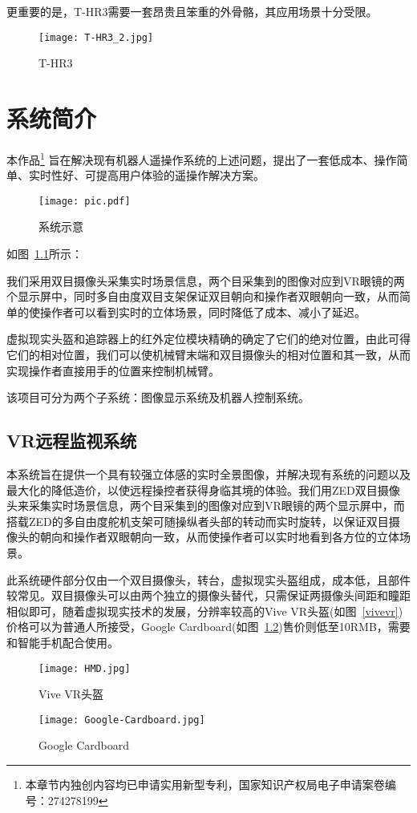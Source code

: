 更重要的是，T-HR3需要一套昂贵且笨重的外骨骼，其应用场景十分受限。

\begin{figure}[htbp]
\small
\centering
\texttt{[image: T-HR3\_2.jpg]}
\caption{T-HR3} 
\label{thr}
\end{figure}




\chapter{系统简介}
本作品\footnote{本章节内独创内容均已申请实用新型专利，国家知识产权局电子申请案卷编号：274278199}
旨在解决现有机器人遥操作系统的上述问题，提出了一套低成本、操作简单、实时性好、可提高用户体验的遥操作解决方案。


\begin{figure}[htbp]
\small
\centering
\texttt{[image: pic.pdf]}
\caption{系统示意} 
\label{pic}
\end{figure}


如图~\ref{pic}所示：

我们采用双目摄像头采集实时场景信息，两个目采集到的图像对应到VR眼镜的两个显示屏中，同时多自由度双目支架保证双目朝向和操作者双眼朝向一致，从而简单的使操作者可以看到实时的立体场景，同时降低了成本、减小了延迟。

虚拟现实头盔和追踪器上的红外定位模块精确的确定了它们的绝对位置，由此可得它们的相对位置，我们可以使机械臂末端和双目摄像头的相对位置和其一致，从而实现操作者直接用手的位置来控制机械臂。


该项目可分为两个子系统：图像显示系统及机器人控制系统。
	
	\section{VR远程监视系统}
本系统旨在提供一个具有较强立体感的实时全景图像，并解决现有系统的问题以及最大化的降低造价，以使远程操控者获得身临其境的体验。我们用ZED双目摄像头来采集实时场景信息，两个目采集到的图像对应到VR眼镜的两个显示屏中，而搭载ZED的多自由度舵机支架可随操纵者头部的转动而实时旋转，以保证双目摄像头的朝向和操作者双眼朝向一致，从而使操作者可以实时地看到各方位的立体场景。
	
此系统硬件部分仅由一个双目摄像头，转台，虚拟现实头盔组成，成本低，且部件较常见。双目摄像头可以由两个独立的摄像头替代，只需保证两摄像头间距和瞳距相似即可，随着虚拟现实技术的发展，分辨率较高的Vive VR头盔(如图~\ref{vivevr})价格可以为普通人所接受，Google Cardboard(如图~\ref{card})售价则低至10RMB，需要和智能手机配合使用。
\begin{figure}
\begin{minipage}{0.48\textwidth}
  \centering
  \texttt{[image: HMD.jpg]}
  \caption{Vive VR头盔}
  \label{vivevr}
\end{minipage}\hfill
\begin{minipage}{0.48\textwidth}
  \centering
  \texttt{[image: Google-Cardboard.jpg]}
  \caption{Google Cardboard}
  \label{card}
\end{minipage}
\end{figure}

